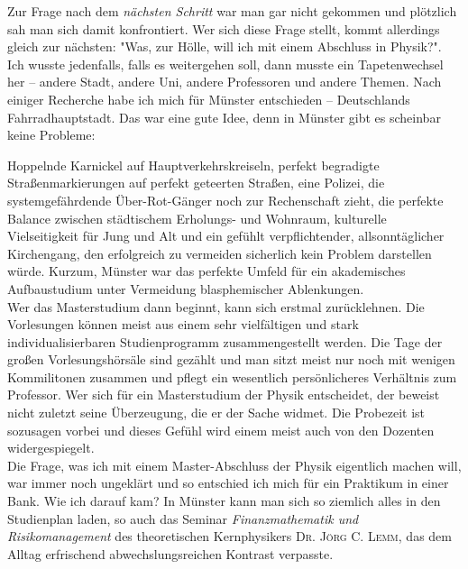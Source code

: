 \begin{multicols*}{2}
Zur Frage nach dem \textit{nächsten Schritt} war man gar nicht gekommen und plötzlich sah man sich damit konfrontiert.
Wer sich diese Frage stellt, kommt allerdings gleich zur nächsten: "Was, zur Hölle, will ich mit einem Abschluss in Physik?". \\ 

Ich wusste jedenfalls, falls es weitergehen soll, dann musste ein Tapetenwechsel her – andere Stadt, andere Uni, andere Professoren und andere Themen.
Nach einiger Recherche habe ich mich für Münster entschieden – Deutschlands Fahrradhauptstadt.
Das war eine gute Idee, denn in Münster gibt es scheinbar keine Probleme: 

Hoppelnde Karnickel auf Hauptverkehrskreiseln, perfekt begradigte Straßenmarkierungen auf perfekt geteerten Straßen, eine Polizei, die systemgefährdende Über-Rot-Gänger noch zur Rechenschaft zieht, die perfekte Balance zwischen städtischem Erholungs- und Wohnraum, kulturelle Vielseitigkeit für Jung und Alt und ein gefühlt verpflichtender, allsonntäglicher Kirchengang, den erfolgreich zu vermeiden sicherlich kein Problem darstellen würde. Kurzum, Münster war das perfekte Umfeld für ein akademisches Aufbaustudium unter Vermeidung blasphemischer Ablenkungen. \\ 

Wer das Masterstudium dann beginnt, kann sich erstmal zurücklehnen.
Die Vorlesungen können meist aus einem sehr vielfältigen und stark individualisierbaren Studienprogramm zusammengestellt werden. 
Die Tage der großen Vorlesungshörsäle sind gezählt und man sitzt meist nur noch mit wenigen Kommilitonen zusammen und pflegt ein wesentlich
persönlicheres Verhältnis zum Professor.
Wer sich für ein Masterstudium der Physik entscheidet, der beweist nicht zuletzt seine Überzeugung, die er der Sache widmet.
Die Probezeit ist sozusagen vorbei und dieses Gefühl wird einem meist auch von den Dozenten widergespiegelt. \\ 

Die Frage, was ich mit einem Master-Abschluss der Physik eigentlich machen will, war immer noch ungeklärt und so entschied ich mich für ein Praktikum in einer Bank.
Wie ich darauf kam? In Münster kann man sich so ziemlich alles in den Studienplan laden,
so auch das Seminar \textit{Finanzmathematik und Risikomanagement} des theoretischen Kernphysikers \textsc{Dr. Jörg C. Lemm}, das dem Alltag erfrischend abwechslungsreichen Kontrast verpasste. \\ 


\end{multicols*}
